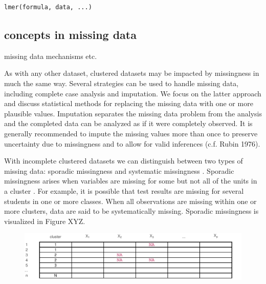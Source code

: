 \documentclass[
  article]{jss}
\begin{document}
\begin{verbatim}
lmer(formula, data, ...)
\end{verbatim}

\hypertarget{concepts-in-missing-data}{%
\subsection{concepts in missing data}\label{concepts-in-missing-data}}

missing data mechanisms etc.

As with any other dataset, clustered datasets may be impacted by
missingness in much the same way. Several strategies can be used to
handle missing data, including complete case analysis and imputation. We
focus on the latter approach and discuss statistical methods for
replacing the missing data with one or more plausible values. Imputation
separates the missing data problem from the analysis and the completed
data can be analyzed as if it were completely observed. It is generally
recommended to impute the missing values more than once to preserve
uncertainty due to missingness and to allow for valid inferences (c.f.
Rubin 1976).

With incomplete clustered datasets we can distinguish between two types
of missing data: sporadic missingness and systematic missingness
\citep{resc13}. Sporadic missingness arises when variables are missing
for some but not all of the units in a cluster \citep{buur18, jola18}.
For example, it is possible that test results are missing for several
students in one or more classes. When all observations are missing
within one or more clusters, data are said to be systematically missing.
Sporadic missingness is visualized in Figure XYZ.

\begin{figure}[h]

{\centering \includegraphics{manuscript_files/figure-pdf/unnamed-chunk-3-1.pdf}

}

\end{figure}
\end{document}
